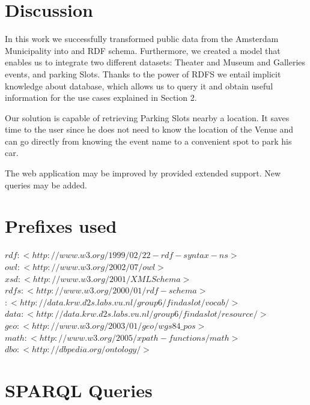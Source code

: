 \documentclass[runningheads,a4paper]{../../StyleFiles/llncs}
\begin{document}
\section{Discussion}
In this work we successfully transformed public data from the Amsterdam Municipality into and RDF schema. Furthermore, we created a model that enables us to integrate two different datasets: Theater and Museum and Galleries events, and parking Slots. Thanks to the power of RDFS we entail implicit knowledge about database, which allows us to query it and obtain useful information for the use cases explained in Section 2. 

Our solution is capable of retrieving Parking Slots nearby a location. It saves time to the user since he does not need to know the location of the Venue and can go directly from knowing the event name to a convenient spot to park his car. 

The web application may be improved by provided extended support. New queries may be added. %





\newpage
\appendix
\section{Prefixes used}

$rdf: <http://www.w3.org/1999/02/22-rdf-syntax-ns>$ \\
$owl: <http://www.w3.org/2002/07/owl>$ \\
$xsd: <http://www.w3.org/2001/XMLSchema>$ \\
$rdfs: <http://www.w3.org/2000/01/rdf-schema>$ \\
$: <http://data.krw.d2s.labs.vu.nl/group6/findaslot/vocab/>$ \\
$data: <http://data.krw.d2s.labs.vu.nl/group6/findaslot/resource/>$ \\
$geo: <http://www.w3.org/2003/01/geo/wgs84\_pos>$ \\
$math: <http://www.w3.org/2005/xpath-functions/math>$ \\
$dbo: <http://dbpedia.org/ontology/>$

\section{SPARQL Queries}
\end{document}
